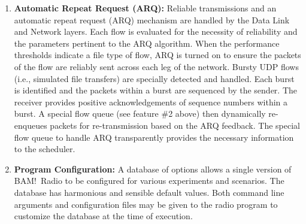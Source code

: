 \documentclass[11pt]{article}
\begin{document}
\begin{enumerate}
     \item \textbf{Automatic Repeat Request (ARQ):}
     Reliable transmissions and an automatic repeat request (ARQ) mechanism are handled by the Data Link and Network layers. Each flow is evaluated for the necessity of reliability and the parameters pertinent to the ARQ algorithm.  When the performance thresholds indicate a file type of flow, ARQ is turned on to ensure the packets of the flow are reliably sent across each leg of the network.  Bursty UDP flows (i.e., simulated file transfers) are specially detected and handled.  Each burst is identified and the packets within a burst are sequenced by the sender.  The receiver provides positive acknowledgements of sequence numbers within a burst.  A special flow queue (see feature \#2 above) then dynamically re-enqueues packets for re-transmission based on the ARQ feedback.  The special flow queue to handle ARQ transparently provides the necessary information to the scheduler.
    
     \item \textbf{Program Configuration:}
     A database of options allows a single version of BAM!\ Radio to be configured for various experiments and scenarios.  The database has harmonious and sensible default values.  Both command line arguments and configuration files may be given to the radio program to customize the database at the time of execution.


\end{enumerate}
\end{document}
